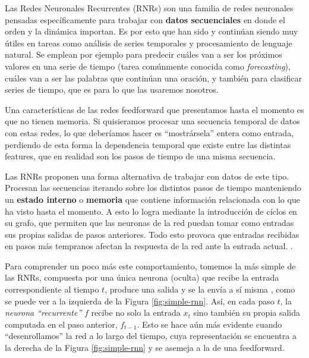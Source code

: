 \documentclass[../../main.tex]{subfiles}
\begin{document}
Las Redes Neuronales Recurrentes (RNRs) son una familia de redes neuronales pensadas
específicamente para trabajar con \textbf{datos secuenciales} en donde el orden y la
dinámica importan. Es por esto que han sido y continúan siendo muy útiles en tareas como
análisis de series temporales y procesamiento de lenguaje natural. Se emplean por ejemplo
para predecir cuáles van a ser los próximos valores en una serie de tiempo (tarea
comúnmente conocida como \textit{forecasting}), cuáles van a ser las palabras que
continúan una oración, y también para clasificar series de tiempo, que es para lo que las
usaremos nosotros.

Una características de las redes feedforward que presentamos hasta el momento es que no
tienen memoria. Si quisieramos procesar una secuencia temporal de datos con estas redes,
lo que deberíamos hacer es ``mostrársela'' entera como entrada, perdiendo de esta forma la
dependencia temporal que existe entre las distintas features, que en realidad son los
pasos de tiempo de una misma secuencia.

Las RNRs proponen una forma alternativa de trabajar con datos de este tipo. Procesan las
secuencias iterando sobre los distintos pasos de tiempo manteniendo un \textbf{estado
interno} o \textbf{memoria} que contiene información relacionada con lo que ha visto hasta
el momento\footnotemark. A esto lo logra mediante la introducción de cíclos en su grafo,
que permiten que las neuronas de la red puedan tomar como entradas sus propias salidas de
pasos anteriores. Todo esto provoca que entradas recibidas en pasos más tempranos afectan
la respuesta de la red ante la entrada actual. \cite{ai-a-modern-approach}
.

Para comprender un poco más este comportamiento, tomemos la más simple de las RNRs,
compuesta por una única neurona (oculta) que recibe la entrada correspondiente al tiempo
\(t\), produce una salida y se la envía a sí misma \cite{hands-on-ML-sklearn-tf}, como se
puede ver a la izquierda de la Figura \ref{fig:simple-rnn}. Así, en cada paso \(t\), la
\textit{neurona ``recurrente''} \(f\) recibe no solo la entrada \(x_t\) sino también su
propia salida computada en el paso anterior, \(f_{t-1}\). Esto se hace aún más evidente
cuando ``desenrollamos'' la red a lo largo del tiempo, cuya representación se encuentra a
la derecha de la Figura \ref{fig:simple-rnn} y se asemeja a la de una feedforward.
\end{document}
